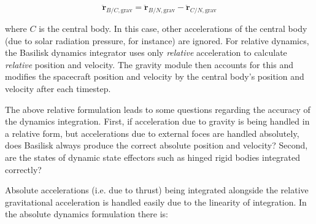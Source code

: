 \begin{equation}
	\ddot{\bm{r}}_{B/C, \mathrm{grav}} =\ddot{\bm{r}}_{B/N, \mathrm{grav}} - \ddot{\bm{r}}_{C/N, \mathrm{grav}}
\end{equation}

where $C$ is the central body. In this case, other accelerations of the central body (due to solar radiation pressure, for instance) are ignored.  For relative dynamics, the Basilisk dynamics integrator uses only \textit{relative} acceleration to calculate \textit{relative} position and velocity. The gravity module then accounts for this and modifies the spacecraft position and velocity by the central body's position and velocity after each timestep.

The above relative formulation leads to some questions regarding the accuracy of the dynamics integration. First, if acceleration due to gravity is being handled in a relative form, but accelerations due to external foces are handled absolutely, does Basilisk always produce the correct absolute position and velocity? Second, are the states of dynamic state effectors such as hinged rigid bodies integrated correctly?

Absolute accelerations (i.e. due to thrust) being integrated alongside the relative gravitational acceleration is handled easily due to the linearity of integration. In the absolute dynamics formulation there is:

